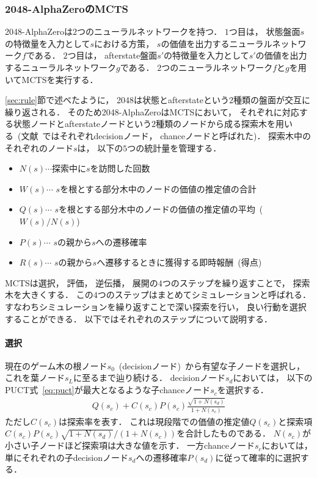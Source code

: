 \subsubsection{2048-AlphaZeroのMCTS}
\label{subsubsec:mcts}
2048-AlphaZeroは$2$つのニューラルネットワークを持つ．
$1$つ目は， 状態盤面$s$の特徴量を入力として$s$における方策， $s$の価値を出力するニューラルネットワーク$f$である．
$2$つ目は， afterstate盤面$s'$の特徴量を入力として$s'$の価値を出力するニューラルネットワーク$g$である．
$2$つのニューラルネットワーク$f$と$g$を用いてMCTSを実行する．

\ref{sec:rule}節で述べたように， 2048は状態とafterstateという$2$種類の盤面が交互に繰り返される．
そのため2048-AlphaZeroはMCTSにおいて， それぞれに対応する状態ノードとafterstateノードという$2$種類のノードから成る探索木を用いる~(文献~\cite{StochasticMuZero}ではそれぞれdecisionノード， chanceノードと呼ばれた)．
探索木中のそれぞれのノード$s$は， 以下の$5$つの統計量を管理する．
\begin{itemize}
  \item $N(s) \cdots$探索中に$s$を訪問した回数
  \item $W(s) \cdots$ $s$を根とする部分木中のノードの価値の推定値の合計
  \item $Q(s) \cdots$ $s$を根とする部分木中のノードの価値の推定値の平均~($W(s) / N(s)$)
  \item $P(s) \cdots$ $s$の親から$s$への遷移確率
  \item $R(s) \cdots$ $s$の親から$s$へ遷移するときに獲得する即時報酬~(得点)
\end{itemize}
MCTSは選択， 評価， 逆伝播， 展開の$4$つのステップを繰り返すことで， 探索木を大きくする．
この$4$つのステップはまとめてシミュレーションと呼ばれる．
すなわちシミュレーションを繰り返すことで深い探索を行い， 良い行動を選択することができる．
以下ではそれぞれのステップについて説明する．

\paragraph{選択}
現在のゲーム木の根ノード$s_0$~(decisionノード)~から有望な子ノードを選択し， これを葉ノード$s_L$に至るまで辿り続ける．
decisionノード$s_d$においては， 以下のPUCT式~\ref{eq:puct}が最大となるような子chanceノード$s_c$を選択する．
\begin{align}
  Q(s_c) + C(s_c)P(s_c)\frac{\sqrt{1+N(s_d)}}{1+N(s_c)}
  \label{eq:puct}
\end{align}
ただし$C(s_c)$は探索率を表す．
これは現段階での価値の推定値$Q(s_c)$と探索項$C(s_c)P(s_c)\sqrt{1+N(s_d)}/(1 + N(s_c))$を合計したものである．
$N(s_c)$が小さい子ノードほど探索項は大きな値を示す．
一方chanceノード$s_c$においては， 単にそれぞれの子decisionノード$s_d$への遷移確率$P(s_d)$に従って確率的に選択する．

